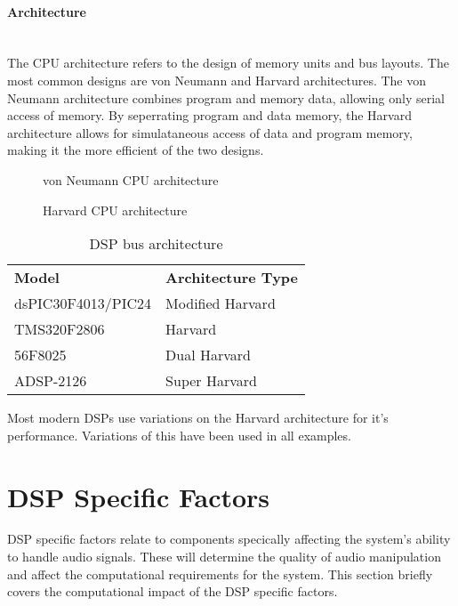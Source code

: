 \documentclass[titlepage]{scrartcl}
\begin{document}
    \paragraph{Architecture}~\\
    The CPU architecture refers to the design of memory units and bus layouts.
    The most common designs are von Neumann and Harvard architectures. The von
    Neumann architecture combines program and memory data, allowing only serial
    access of memory. By seperrating program and data memory, the Harvard
    architecture allows for simulataneous access of data and program memory,
    making it the more efficient of the two designs.~\parencite[p.320-321]{raf2014fdlm}
    \begin{figure}[H]
        \caption{von Neumann CPU architecture~\parencite[p.320]{raf2014fdlm}}
    \end{figure}
    \begin{figure}[H]
        \caption{Harvard CPU architecture~\parencite[p.321]{raf2014fdlm}}
    \end{figure}

    \begin{table}[H]
    \centering
    \caption{DSP bus architecture}
    \label{my-label}
    \begin{tabular}{ll}
        \textbf{Model}              & \textbf{Architecture Type}\\
        dsPIC30F4013/PIC24 & Modified Harvard\\
        TMS320F2806        & Harvard\\
        56F8025            & Dual Harvard\\
        ADSP-2126          & Super Harvard
    \end{tabular}
    \end{table}

    Most modern DSPs use variations on the Harvard architecture for it's
    performance. Variations of this have been used in all examples.

    \section{DSP Specific Factors}
    DSP specific factors relate to components specically affecting the system's
    ability to handle audio signals. These will determine the quality of audio
    manipulation and affect the computational requirements for the system. This
    section briefly covers the computational impact of the DSP specific
    factors.
\end{document}
